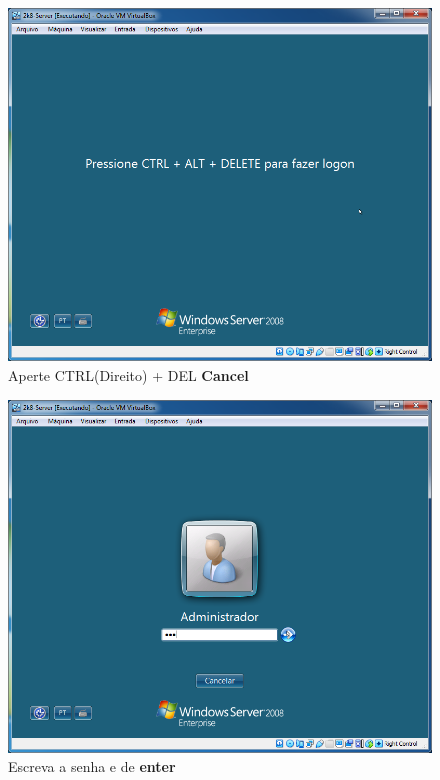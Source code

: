 \documentclass[10pt]{article}
\begin{document}
\begin{figure}[H]
    \centering
    \caption{Aperte CTRL(Direito) + DEL \textbf{Cancel}}
    \label{fig:3142}
    \includegraphics[width=\linewidth]{images/ativacao_das_maquinas_virtuais/configuracao_inicial_das_maquinas_virtuais/042.png}
\end{figure}
\begin{figure}[H]
    \centering
    \caption{Escreva a senha e de \textbf{enter}}
    \label{fig:3144}
    \includegraphics[width=\linewidth]{images/ativacao_das_maquinas_virtuais/configuracao_inicial_das_maquinas_virtuais/044.png}
\end{figure}
\end{document}
